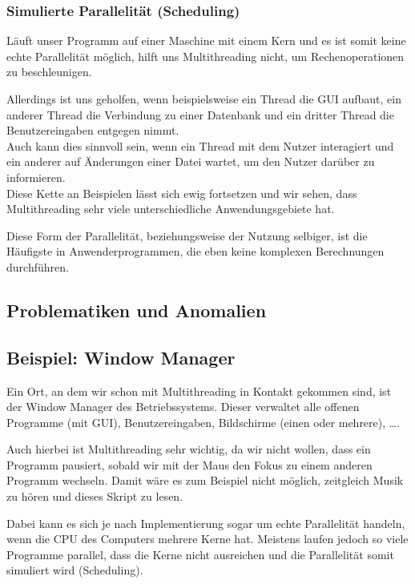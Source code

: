 	\subsubsection{Simulierte Parallelität (Scheduling)}
		Läuft unser Programm auf einer Maschine mit einem Kern und es ist somit keine echte Parallelität möglich, hilft uns Multithreading nicht, um Rechenoperationen zu beschleunigen.
		
		Allerdings ist uns geholfen, wenn beispielsweise ein Thread die GUI aufbaut, ein anderer Thread die Verbindung zu einer Datenbank und ein dritter Thread die Benutzereingaben entgegen nimmt. \\ Auch kann dies sinnvoll sein, wenn ein Thread mit dem Nutzer interagiert und ein anderer auf Änderungen einer Datei wartet, um den Nutzer darüber zu informieren. \\ Diese Kette an Beispielen lässt sich ewig fortsetzen und wir sehen, dass Multithreading sehr viele unterschiedliche Anwendungsgebiete hat.
		
		Diese Form der Parallelität, beziehungsweise der Nutzung selbiger, ist die Häufigste in Anwenderprogrammen, die eben keine komplexen Berechnungen durchführen.

\subsection{Problematiken und Anomalien}

\subsection{Beispiel: Window Manager}
	Ein Ort, an dem wir schon mit Multithreading in Kontakt gekommen sind, ist der Window Manager des Betriebssystems. Dieser verwaltet alle offenen Programme (mit GUI), Benutzereingaben, Bildschirme (einen oder mehrere), \dots.
	
	Auch hierbei ist Multithreading sehr wichtig, da wir nicht wollen, dass ein Programm pausiert, sobald wir mit der Maus den Fokus zu einem anderen Programm wechseln. Damit wäre es zum Beispiel nicht möglich, zeitgleich Musik zu hören und dieses Skript zu lesen.
	
	Dabei kann es sich je nach Implementierung sogar um echte Parallelität handeln, wenn die CPU des Computers mehrere Kerne hat. Meistens laufen jedoch so viele Programme parallel, dass die Kerne nicht ausreichen und die Parallelität somit simuliert wird (Scheduling).

